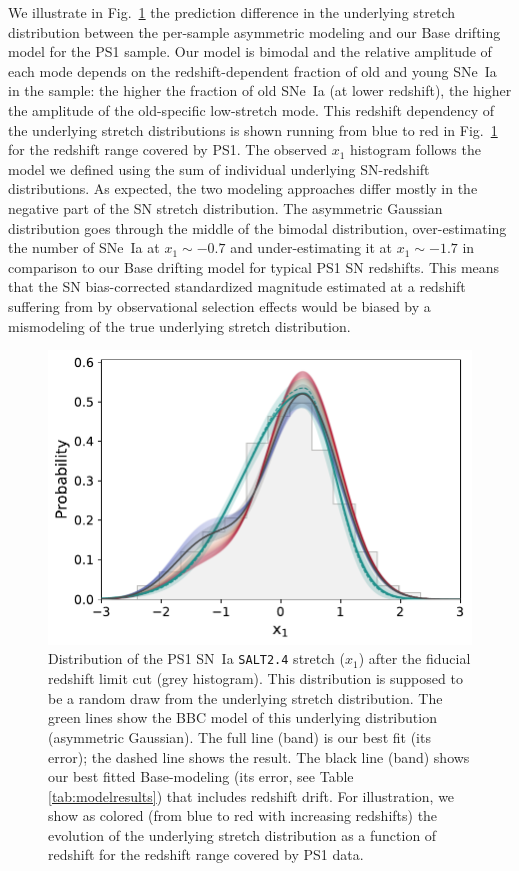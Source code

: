 \documentclass[]{aa}
\begin{document}
We illustrate in Fig.~\ref{fig:bbc_pdf_ps1} the prediction difference in the
underlying stretch distribution between the per-sample asymmetric modeling and
our Base drifting model for the PS1 sample. Our model is bimodal and the
relative amplitude of each mode depends on the redshift-dependent fraction of
old and young SNe~Ia in the sample: the higher the fraction of old SNe~Ia (at
lower redshift), the higher the amplitude of the old-specific low-stretch mode.
This redshift dependency of the underlying stretch distributions is
shown running from blue to red in Fig.~\ref{fig:bbc_pdf_ps1} for the
redshift range covered by PS1. The observed $x_1$ histogram follows the
model we defined using the sum of individual underlying SN-redshift
distributions. As expected, the two modeling approaches differ mostly in the
negative part of the SN stretch distribution. The asymmetric Gaussian
distribution goes through the middle of the bimodal distribution,
over-estimating the number of SNe~Ia at $x_1\sim-0.7$ and under-estimating it at
$x_1\sim-1.7$ in comparison to our Base drifting model for typical PS1 SN
redshifts. This means that the SN bias-corrected standardized magnitude
estimated at a redshift suffering from by observational
selection effects would be biased by a mismodeling of the true
underlying stretch distribution.

\begin{figure}
    \centering
    \includegraphics[width=\linewidth]{Article_figures/bbc_comp_PS1_hist-nr.pdf}
    \caption{Distribution of the PS1 SN~Ia \textsc{\texttt{SALT2.4}} stretch
        ($x_1$) after the fiducial redshift limit cut (grey histogram). This
        distribution is supposed to be a random draw from the underlying stretch
        distribution. The green lines show the BBC model of this underlying
        distribution (asymmetric Gaussian). The full line (band) is our best fit
        (its error); the dashed line shows the \cite{scolnic2018a} result. The
        black line (band) shows our best fitted Base-modeling (its error, see
        Table \ref{tab:modelresults}) that includes redshift drift. For
        illustration, we show as colored (from blue to red with increasing
        redshifts) the evolution of the underlying stretch distribution as a
        function of redshift for the redshift range covered by PS1 data.}
    \label{fig:bbc_pdf_ps1}
\end{figure}
\end{document}
